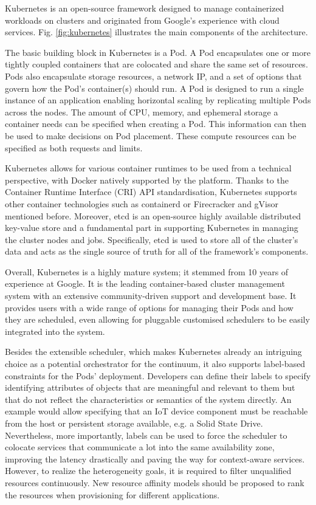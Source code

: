 Kubernetes \cite{kubernetes} is an open-source framework designed to manage containerized workloads on clusters and originated from Google's experience with cloud services. Fig. \ref{fig:kubernetes} illustrates the main components of the architecture.

The basic building block in Kubernetes is a Pod. A Pod encapsulates one or more tightly coupled containers that are colocated and share the same set of resources. Pods also encapsulate storage resources, a network IP, and a set of options that govern how the Pod's container(s) should run. A Pod is designed to run a single instance of an application enabling horizontal scaling by replicating multiple Pods across the nodes. The amount of CPU, memory, and ephemeral storage a container needs can be specified when creating a Pod. This information can then be used to make decisions on Pod placement. These compute resources can be specified as both requests and limits.

Kubernetes allows for various container runtimes to be used from a technical perspective, with Docker natively supported by the platform. Thanks to the Container Runtime Interface (CRI) API standardisation, Kubernetes supports other container technologies such as containerd \cite{containerd} or Firecracker and gVisor mentioned before. Moreover, etcd \cite{etcd} is an open-source highly available distributed key-value store and a fundamental part in supporting Kubernetes in managing the cluster nodes and jobs. Specifically, etcd is used to store all of the cluster's data and acts as the single source of truth for all of the framework's components.

Overall, Kubernetes is a highly mature system; it stemmed from 10 years of experience at Google. It is the leading container-based cluster management system with an extensive community-driven support and development base. It provides users with a wide range of options for managing their Pods and how they are scheduled, even allowing for pluggable customised schedulers to be easily integrated into the system.

Besides the extensible scheduler, which makes Kubernetes already an intriguing choice as a potential orchestrator for the continuum, it also supports label-based constraints for the Pods' deployment. Developers can define their labels to specify identifying attributes of objects that are meaningful and relevant to them but that do not reflect the characteristics or semantics of the system directly. An example would allow specifying that an IoT device component must be reachable from the host or persistent storage available, e.g. a Solid State Drive. Nevertheless, more importantly, labels can be used to force the scheduler to colocate services that communicate a lot into the same availability zone, improving the latency drastically and paving the way for context-aware services. However, to realize the heterogeneity goals, it is required to filter unqualified resources continuously. New resource affinity models should be proposed to rank the resources when provisioning for different applications. 

